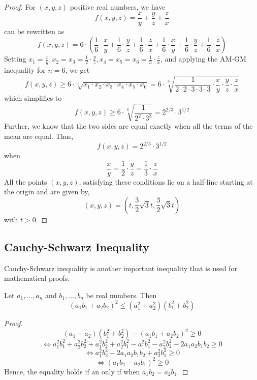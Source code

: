 \documentclass[
	12pt, %
	fleqn, %
	a4paper, %
]{LegrandOrangeBook}
\begin{document}
    \begin{proof}
    For \( (x, y, z) \) positive real numbers, we have
    \[
    f(x, y, z) = \frac{x}{y} + \frac{y}{z} + \frac{z}{x}
    \]
    can be rewritten as
    \[
    f(x, y, z) = 6 \cdot \left( \frac{1}{6} \cdot \frac{x}{y} + \frac{1}{6} \cdot \frac{y}{z} + \frac{1}{6} \cdot \frac{z}{x} + \frac{1}{6} \cdot \frac{x}{y} + \frac{1}{6} \cdot \frac{y}{z} + \frac{1}{6} \cdot \frac{z}{x} \right)
    \]
    Setting \( x_1 = \frac{x}{y}, x_2 = x_3 = \frac{1}{2} \cdot \frac{y}{z}, x_4 = x_5 = x_6 = \frac{1}{3} \cdot \frac{z}{x} \), and applying the AM-GM inequality for \( n = 6 \), we get
    \[
    f(x, y, z) \geq 6 \cdot \sqrt[6]{x_1 \cdot x_2 \cdot x_3 \cdot x_4 \cdot x_5 \cdot x_6} = 6 \cdot \sqrt[6]{\frac{1}{2 \cdot 2 \cdot 3 \cdot 3 \cdot 3} \cdot \frac{x}{y} \cdot \frac{y}{z} \cdot \frac{z}{x}}
    \]
    which simplifies to
    \[
    f(x, y, z) \geq 6 \cdot \sqrt[6]{\frac{1}{2^2 \cdot 3^3}} = 2^{2/3} \cdot 3^{1/2}
    \]
    Further, we know that the two sides are equal exactly when all the terms of the mean are equal. Thus,
    \[
    f(x, y, z) = 2^{2/3} \cdot 3^{1/2}
    \]
    when
    \[
    \frac{x}{y} = \frac{1}{2} \cdot \frac{y}{z} = \frac{1}{3} \cdot \frac{z}{x}
    \]
    All the points \( (x, y, z) \), satisfying these conditions lie on a half-line starting at the origin and are given by,
    \[
    (x, y, z) = \left( t, \frac{3}{2}\sqrt{3}t, \frac{3}{2}\sqrt{3}t \right)
    \]
    with \( t > 0 \).
    \end{proof}
    
\subsection{Cauchy-Schwarz Inequality}
Cauchy-Schwarz inequality is another important inequality that is used for mathematical proofs. 

\begin{theorem}\label{CSineq}
    Let \( a_1, \ldots, a_n \) and \( b_1, \ldots, b_n \) be real numbers. Then
\[
(a_1b_1 + a_2b_2)^2 \leq (a_1^2 + a_2^2)(b_1^2 + b_2^2)
\]
\end{theorem}
\begin{proof}
\[
(a_1 + a_2)(b_1^2 + b_2^2) - (a_1b_1 + a_2b_2)^2 \geq 0
\]
\[
\Leftrightarrow a_1^2b_1^2 + a_2^2b_2^2 + a_1^2b_2^2 + a_2^2b_1^2 - a_1^2b_1^2 - a_2^2b_2^2 - 2a_1a_2b_1b_2 \geq 0
\]
\[
\Leftrightarrow a_1^2b_2^2 - 2a_1a_2b_1b_2 + a_2^2b_1^2 \geq 0
\]
\[
\Leftrightarrow (a_1b_2 - a_2b_1)^2 \geq 0
\]
Hence, the equality holds if an only if when $a_1b_2=a_2b_1$.
\end{proof}
\end{document}
